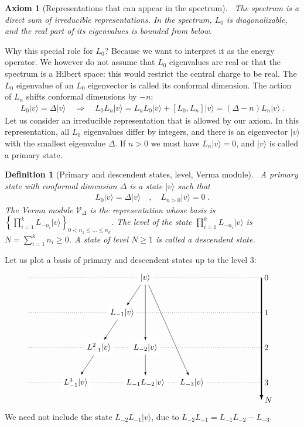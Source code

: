 \documentclass[12pt, a4paper]{article}
\theoremstyle{break}
\newtheorem{hyp}[exo]{Axiom}
\newtheorem{defn}[exo]{Definition}
\begin{document}
\begin{hyp}[Representations that can appear in the spectrum]
 ~\label{hyp:rep}
 The spectrum is a direct sum of irreducible representations. In the spectrum, $L_0$ is diagonalizable, and the real part of its eigenvalues is bounded from below.
\end{hyp}
Why this special role for $L_0$? Because we want to interpret it as the energy operator. 
We however do not assume that $L_0$ eigenvalues are real or that the spectrum is a Hilbert space: this would restrict the central charge to be real. The $L_0$ eigenvalue of an $L_0$ eigenvector is called its conformal dimension. The action of $L_n$ shifts conformal dimensions by $-n$:
\begin{align}
 L_0|v\rangle = \Delta|v\rangle \quad \Rightarrow\quad  L_0 L_n|v\rangle = L_nL_0|v\rangle + [L_0, L_n] |v\rangle  = (\Delta-n)L_n|v\rangle \ .
\end{align}
Let us consider an irreducible representation that is allowed by our axiom. In this representation, all $L_0$ eigenvalues differ by integers, and there is an eigenvector $|v\rangle$ with the smallest eigenvalue $\Delta$. 
If $n>0$ we must have $L_n|v\rangle =0$, and $|v\rangle $ is called a primary state.

\begin{defn}[Primary and descendent states, level, Verma module]
 ~\label{def:prim}
 A primary state with conformal dimension $\Delta$ is a state $|v\rangle$ such that 
 \begin{align}
  L_0 |v\rangle = \Delta |v\rangle \quad , \quad L_{n>0} |v\rangle = 0\ .
 \end{align}
The Verma module $\mathcal V_\Delta$ is the representation whose basis is 
 $
 \left\{ \prod_{i=1}^k L_{-n_i} |v\rangle\right\}_{ 0<n_1\leq \dots \leq n_k}
 $.
The level of the state $\prod_{i=1}^k L_{-n_i} |v\rangle $ is $N=\sum_{i=1}^k n_i\geq 0$. A state of level $N\geq 1$ is called a descendent state.
\end{defn}
Let us plot a basis of primary and descendent states up to the level $3$:
\begin{align}
 \begin{tikzpicture}[scale = .25, baseline=(current  bounding  box.center)]
  \draw[-latex, very thick] (20, 0) -- (20, -21) node [right] {$N$};
  \foreach \x in {0, ..., 3}
  {
  \draw [dotted] (-20, {-6*\x}) -- (20, {-6*\x}) node [right] {${\x}$};
  }
  \node[fill = white] at (0, 0) (0) {$|v\rangle$};
  \node[fill = white] at (-4,-6) (1) {$L_{-1}|v\rangle$};
  \node[fill = white] at (-8, -12) (11) {$L_{-1}^2|v\rangle$};
  \node[fill = white] at (-12, -18) (111) {$L_{-1}^3|v\rangle$};
  \node[fill = white] at (0,-12) (2) {$L_{-2}|v\rangle$};
  \node[fill = white] at (0,-18) (12) {$L_{-1}L_{-2}|v\rangle$};
  \node[fill = white] at (8,-18) (3) {$L_{-3}|v\rangle$};
  \draw[-latex] (0) -- (1);
  \draw[-latex] (1) -- (11);
  \draw[-latex] (11) -- (111);
  \draw[-latex] (0) -- (2);
  \draw[-latex] (0) -- (3);
  \draw[-latex] (2) -- (12);
 \end{tikzpicture}
\end{align}
We need not include the state $L_{-2}L_{-1}|v\rangle$, due to $L_{-2}L_{-1} = L_{-1}L_{-2} - L_{-3}$.
\end{document}
